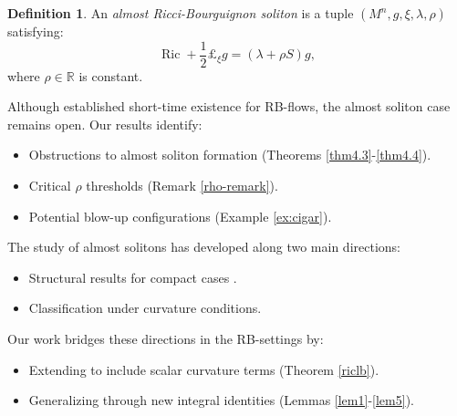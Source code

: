 \documentclass[a4paper, twoside, 10pt]{article}
\numberwithin{equation}{section}
\theoremstyle{definition}
\newtheorem{definition}{Definition}[section]
\begin{document}
\begin{definition}\label{def:almostRB}
An {\it almost Ricci-Bourguignon soliton} is a tuple $(M^n,g,\xi,\lambda,\rho)$ satisfying:
\begin{equation}\label{rbsoliton}
    \operatorname{Ric} + \frac{1}{2}\pounds_\xi g = (\lambda + \rho S)g,
\end{equation}
where $\rho \in \mathbb{R}$ is constant.
\end{definition}

Although \cite{CCD17} established short-time existence for RB-flows, the almost soliton case remains open. Our results identify:
\begin{itemize}
    \item Obstructions to almost soliton formation (Theorems \ref{thm4.3}-\ref{thm4.4}).
    \item Critical $\rho$ thresholds (Remark \ref{rho-remark}).
    \item Potential blow-up configurations (Example \ref{ex:cigar}).
    \end{itemize}
\smallskip
The study of almost solitons has developed along two main directions:
\begin{itemize}
    \item Structural results for compact cases \cite{barros2012some,BBR}.
    \item Classification under curvature conditions\cite{barros2013note,SDARSIS}.
\end{itemize}
\smallskip
Our work bridges these directions in the RB-settings by:
\begin{itemize}
    \item Extending \cite[Theorem 2]{barros2012some} to include scalar curvature terms (Theorem \ref{riclb}).
    \item Generalizing \cite[Proposition 1]{barros2013note} through new integral identities (Lemmas \ref{lem1}-\ref{lem5}).
\end{itemize}
\end{document}
